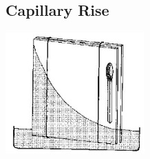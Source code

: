 \begin{multicols}{2}

\columnbreak

\subsection{Capillary Rise} 

\begin{center}
\includegraphics[width=0.4\textwidth]{./img/source/capillary-glass.jpg}
\end{center}


\end{multicols}
